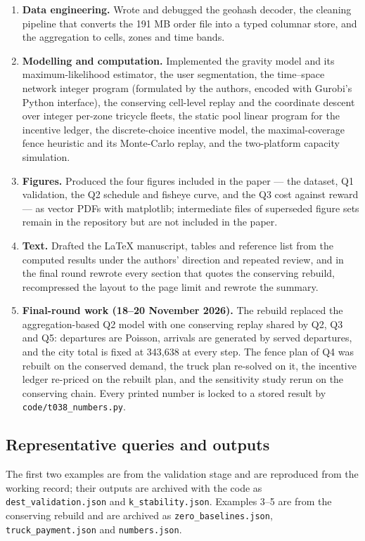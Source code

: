 \begin{enumerate}[leftmargin=1.6em]
\item \textbf{Data engineering.} Wrote and debugged the geohash decoder, the
  cleaning pipeline that converts the 191 MB order file into a typed columnar store,
  and the aggregation to cells, zones and time bands.
\item \textbf{Modelling and computation.} Implemented the gravity model and its
  maximum-likelihood estimator, the user segmentation, the time--space network integer
  program (formulated by the authors, encoded with Gurobi's Python interface), the
  conserving cell-level replay and the coordinate descent over integer per-zone
  tricycle fleets, the static pool linear program for the incentive ledger, the
  discrete-choice incentive model, the maximal-coverage fence heuristic and its
  Monte-Carlo replay, and the two-platform capacity simulation.
\item \textbf{Figures.} Produced the four figures included in the paper --- the dataset,
  Q1 validation, the Q2 schedule and fisheye curve, and the Q3 cost against reward ---
  as vector PDFs with matplotlib; intermediate files of superseded figure sets remain
  in the repository but are not included in the paper.
\item \textbf{Text.} Drafted the \LaTeX{} manuscript, tables and reference list from
  the computed results under the authors' direction and repeated review, and in the
  final round rewrote every section that quotes the conserving rebuild, recompressed
  the layout to the page limit and rewrote the summary.
\item \textbf{Final-round work (18--20 November 2026).} The rebuild replaced the
  aggregation-based Q2 model with one conserving replay shared by Q2, Q3 and Q5:
  departures are Poisson, arrivals are generated by served departures, and the city
  total is fixed at 343,638 at every step. The fence plan of Q4 was rebuilt on the
  conserved demand, the truck plan re-solved on it, the incentive ledger re-priced on
  the rebuilt plan, and the sensitivity study rerun on the conserving chain. Every
  printed number is locked to a stored result by \texttt{code/t038\_numbers.py}.
\end{enumerate}

\subsection*{Representative queries and outputs}

The first two examples are from the validation stage and are reproduced from the
working record; their outputs are archived with the code as
\texttt{dest\_validation.json} and \texttt{k\_stability.json}. Examples 3--5 are from
the conserving rebuild and are archived as \texttt{zero\_baselines.json},
\texttt{truck\_payment.json} and \texttt{numbers.json}.

